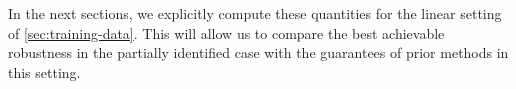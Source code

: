In the next sections, we 
explicitly compute these quantities for the linear setting of \cref{sec:training-data}.
This will allow us to compare
the best achievable robustness in the partially identified case with the guarantees of prior methods in this setting.
